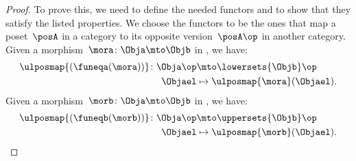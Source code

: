 \begin{proof}
To prove this, we need to define the needed functors and to show that they satisfy the listed properties.
We choose the functors to be the ones that map a poset~$\posA$ in a category to its opposite version~$\posA\op$ in another category.
Given a morphism~$\mora\colon \Obja \mto \Objb$ in \UPos, we have:
\begin{equation*}
    \begin{aligned}
        \ulposmap{(\funeqa(\mora))}\colon \Obja\op &\mto \lowersets{\Objb}\op\\
    \Objael&\mapsto \ulposmap{\mora}(\Objael).
    \end{aligned}
\end{equation*}
Given a morphism~$\morb\colon \Obja \mto \Objb$ in \LPos, we have:
\begin{equation*}
    \begin{aligned}
    \ulposmap{(\funeqb(\morb))}\colon \Obja\op &\mto \uppersets{\Objb}\op\\
    \Objael&\mapsto \ulposmap{\morb}(\Objael).
    \end{aligned}
\end{equation*}

\end{proof}
